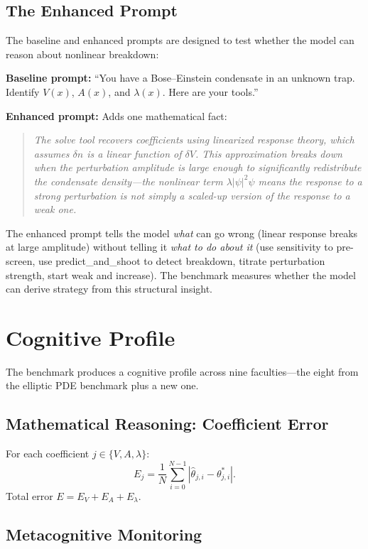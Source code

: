\documentclass[11pt]{article}
\begin{document}
\subsection{The Enhanced Prompt}

The baseline and enhanced prompts are designed to test whether the model can reason about nonlinear breakdown:

\medskip
\noindent\textbf{Baseline prompt:} ``You have a Bose--Einstein condensate in an unknown trap. Identify $V(x)$, $A(x)$, and $\lambda(x)$. Here are your tools.''

\medskip
\noindent\textbf{Enhanced prompt:} Adds one mathematical fact:
\begin{quote}
\itshape The solve tool recovers coefficients using linearized response theory, which assumes $\delta n$ is a linear function of $\delta V$. This approximation breaks down when the perturbation amplitude is large enough to significantly redistribute the condensate density---the nonlinear term $\lambda|\psi|^2\psi$ means the response to a strong perturbation is not simply a scaled-up version of the response to a weak one.
\end{quote}

The enhanced prompt tells the model \emph{what} can go wrong (linear response breaks at large amplitude) without telling it \emph{what to do about it} (use sensitivity to pre-screen, use predict\_and\_shoot to detect breakdown, titrate perturbation strength, start weak and increase). The benchmark measures whether the model can derive strategy from this structural insight.

\section{Cognitive Profile}

The benchmark produces a cognitive profile across nine faculties---the eight from the elliptic PDE benchmark plus a new one.

\subsection{Mathematical Reasoning: Coefficient Error}

For each coefficient $j \in \{V, A, \lambda\}$:
\[
E_j = \frac{1}{N}\sum_{i=0}^{N-1}|\hat{\theta}_{j,i} - \theta^*_{j,i}|.
\]
Total error $E = E_V + E_A + E_\lambda$.

\subsection{Metacognitive Monitoring}
\end{document}
